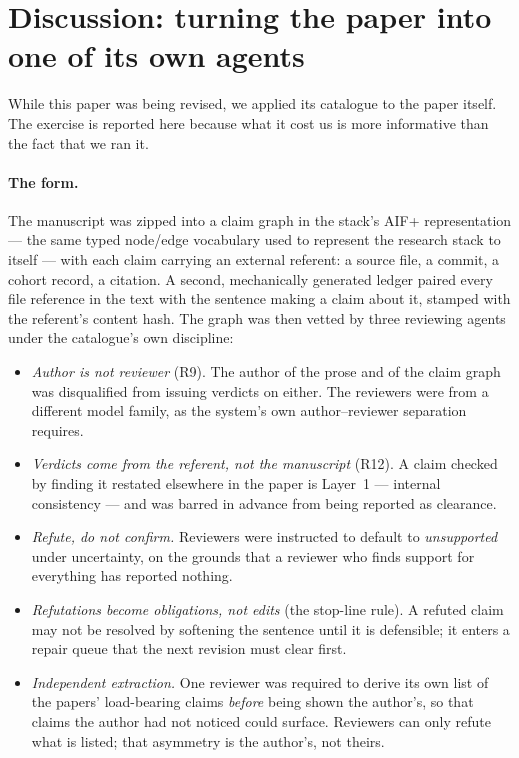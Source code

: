 \section{Discussion: turning the paper into one of its own agents}\label{sec:discussion}

While this paper was being revised, we applied its catalogue to the paper
itself.  The exercise is reported here because what it cost us is more
informative than the fact that we ran it.

\paragraph{The form.}  The manuscript was zipped into a claim graph in the
stack's AIF+ representation --- the same typed node/edge vocabulary used to
represent the research stack to itself --- with each claim carrying an external
referent: a source file, a commit, a cohort record, a citation.  A second,
mechanically generated ledger paired every file reference in the text with the
sentence making a claim about it, stamped with the referent's content hash.  The
graph was then vetted by three reviewing agents under the catalogue's own
discipline:

\begin{itemize}\tightlist
\item \emph{Author is not reviewer} (R9).  The author of the prose and of the
  claim graph was disqualified from issuing verdicts on either.  The reviewers
  were from a different model family, as the system's own author--reviewer
  separation requires.
\item \emph{Verdicts come from the referent, not the manuscript} (R12).  A claim
  checked by finding it restated elsewhere in the paper is Layer~1 --- internal
  consistency --- and was barred in advance from being reported as clearance.
\item \emph{Refute, do not confirm.}  Reviewers were instructed to default to
  \emph{unsupported} under uncertainty, on the grounds that a reviewer who finds
  support for everything has reported nothing.
\item \emph{Refutations become obligations, not edits} (the stop-line rule).  A
  refuted claim may not be resolved by softening the sentence until it is
  defensible; it enters a repair queue that the next revision must clear first.
\item \emph{Independent extraction.}  One reviewer was required to derive its own
  list of the papers' load-bearing claims \emph{before} being shown the author's,
  so that claims the author had not noticed could surface.  Reviewers can only
  refute what is listed; that asymmetry is the author's, not theirs.
\end{itemize}

